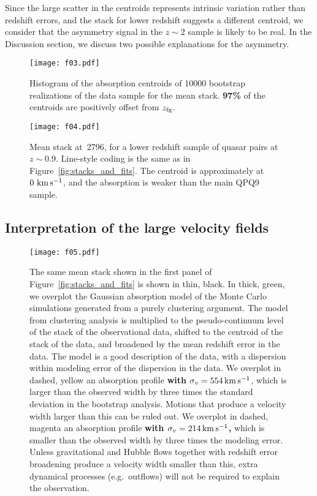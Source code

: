\documentclass[iop]{emulateapj}
\begin{document}
{Since the large scatter in the centroids represents intrinsic variation rather than redshift 
errors, and the  stack for lower redshift suggests a different centroid, we 
consider that the asymmetry signal in the $z\sim2$ sample is likely to be real. In the Discussion 
section, we discuss two possible explanations for the asymmetry. 

\begin{figure}
\texttt{[image: f03.pdf]}
\caption{Histogram of the absorption centroids of 10000 bootstrap realizations of the data sample 
for the  mean stack. {\bf 97\%} of the centroids are positively offset from $z_{\rm fg}$.}
\label{fig:histogram_cen}
\end{figure}

\begin{figure}
\texttt{[image: f04.pdf]}
\caption{Mean stack at \,2796, for a lower redshift sample of quasar pairs at 
$z\sim0.9$. Line-style coding is the same as in Figure~\ref{fig:stacks_and_fits}. The centroid is 
approximately at $0\,{\rm \,km\,s^{-1}}$, and the absorption is weaker than the main QPQ9 sample. 
}
\label{fig:stack_z1}
\end{figure}


\subsection{Interpretation of the large velocity fields}
\label{sec:significance_width}

\begin{figure}
\texttt{[image: f05.pdf]}
\caption{The same  mean stack shown in the first panel of 
Figure~\ref{fig:stacks_and_fits} is shown in thin, black. In thick, green, we overplot the 
Gaussian absorption model of the Monte Carlo simulations generated from a purely clustering 
argument. The model from clustering analysis is multiplied to the pseudo-continuum level of the 
stack of the observational data, shifted to the centroid of the stack of the data, and broadened 
by the mean redshift error in the data. The model is a good description of the data, with a 
dispersion within modeling error of the dispersion in the data. We overplot in dashed, yellow an 
absorption profile {\bf with $\sigma_v=554\,{\rm km\,s^{-1}}$}, which is larger than the observed width
by three times the standard deviation in the bootstrap analysis. Motions that produce a velocity 
width larger than this can be ruled out. We overplot in dashed, magenta an absorption profile {\bf with
$\sigma_v=214\,{\rm km\,s^{-1}}$,} which is smaller than the observed width by three times the
modeling error. Unless gravitational and Hubble flows together with redshift error broadening 
produce a velocity width smaller than this, extra dynamical processes (e.g.\ outflows) will not be 
required to explain the observation. 
}
\label{fig:monte}
\end{figure}

}
\end{document}
